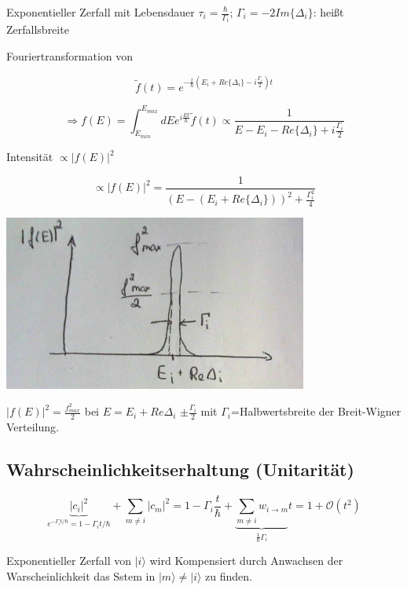 Exponentieller Zerfall mit Lebensdauer \(\tau_i = \frac{\hbar}{\Gamma_i}\); \(\Gamma_i = -2Im\{\Delta_i\}\): heißt Zerfallsbreite

Fouriertransformation von 

\[\tilde f(t) = e^{-\frac{i}{\hbar}(E_i + Re\{\Delta_i\} - i\frac{\Gamma_i}{2})t}\]

\[\Rightarrow f(E) = \int_{E_{min}}^{E_{max}}dE e^{i\frac{Et}{\hbar}}\tilde f(t) \propto \frac{1}{E-E_i-Re\{\Delta_i\}+i\frac{\Gamma_i}{2}}\]

Intensität \(\propto |f(E)|^2 \)

\[\propto |f(E)|^2=  \frac{1}{(E-(E_i+Re\{\Delta_i\}))^2+\frac{\Gamma_i^2}{4}} \]


\includegraphics[width=0.75\textwidth]{kap03_13.png}

\(|f(E)|^2=\frac{f^2_{max}}{2}\) bei \(E=E_i + Re\Delta_i\) \(\pm\frac{\Gamma_i}{2}\) mit \(\Gamma_i\)=Halbwertsbreite der Breit-Wigner Verteilung.



\subsection{Wahrscheinlichkeitserhaltung (Unitarität)}

\[\underbrace{|c_i|^2}_{e^{-\Gamma_it/\hbar}=1-\Gamma_it/\hbar} + \sum_{m\neq i}|c_m|^2 = 1 - \Gamma_i\frac{t}{\hbar}+\underbrace{\sum_{m\neq i}w_{i\to m}}_{\frac{1}{\hbar}\Gamma_i}t=1+\mathcal O(t^2)\]

Exponentieller Zerfall von \(|i\rangle \) wird Kompensiert durch Anwachsen der Warscheinlichkeit das Sstem in \(|m\rangle \neq |i\rangle \) zu finden.



